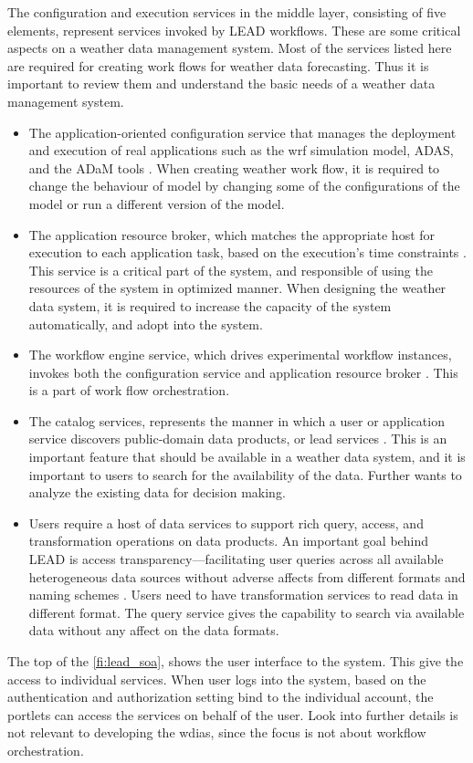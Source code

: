 The configuration and execution services in the middle layer, consisting of five elements, represent services invoked by LEAD workflows. These are some critical aspects on a weather data management system. Most of the services listed here are required for creating work flows for weather data forecasting. Thus it is important to review them and understand the basic needs of a weather data management system.

\begin{itemize}
\item The application-oriented configuration service that manages the deployment and execution of real applications such as the \acrshort{wrf} simulation model, ADAS, and the ADaM tools \cite{Droegemeier2005Service-OrientedWeather}. When creating weather work flow, it is required to change the behaviour of model by changing some of the configurations of the model or run a different version of the model.
\item The application resource broker, which matches the appropriate host for execution to each application task, based on the execution’s time constraints \cite{}. This service is a critical part of the system, and responsible of using the resources of the system in optimized manner. When designing the weather data system, it is required to increase the capacity of the system automatically, and adopt into the system.
\item The workflow engine service, which drives experimental workflow instances, invokes both the configuration service and application resource broker \cite{Droegemeier2005Service-OrientedWeather}. This is a part of work flow orchestration.
\item The catalog services, represents the manner in which a user or application service discovers public-domain data products, or \acrshort{lead} services \cite{Droegemeier2005Service-OrientedWeather}. This is an important feature that should be available in a weather data system, and it is important to users to search for the availability of the data. Further wants to analyze the existing data for decision making.
\item Users require a host of data services to support rich query, access, and transformation operations on data products. An important goal behind LEAD is access transparency—facilitating user queries across all available heterogeneous data sources without adverse affects from different formats and naming schemes \cite{Droegemeier2005Service-OrientedWeather}. Users need to have transformation services to read data in different format. The query service gives the capability to search via available data without any affect on the data formats.
\end{itemize}
The top of the \ref{fi:lead_soa}, shows the user interface to the system. This give the access to individual services. When user logs into the system, based on the authentication and authorization setting bind to the individual account, the portlets can access the services on behalf of the user. Look into further details is not relevant to developing the \acrshort{wdias}, since the focus is not about workflow orchestration.

